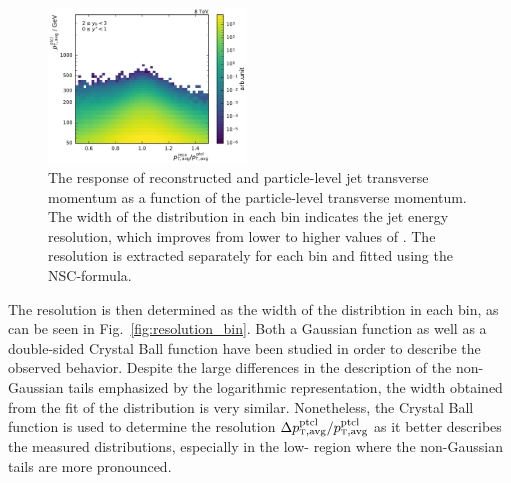 \begin{figure}[htbp]
    \includegraphics[width=0.47\textwidth]{figures/measurement/gen_vs_reco_vs_gen_ptavg_yb2ys0.pdf}
    \caption[Comparison of particle-level and reconstructed dijet transverse momentum]
            {The response of reconstructed and particle-level jet transverse
                momentum as a function of the particle-level transverse momentum.
                The width of the distribution in each \ptavg bin indicates the
                jet energy resolution, which improves from lower to higher values of \ptavg. The
                resolution is extracted separately for each bin and
                fitted using the NSC-formula.}
    \label{fig:gen_vs_reco_over_gen}
\end{figure}

The resolution is then determined as the width of the distribtion in each
\ptavggen
bin, as can be seen in Fig.~\ref{fig:resolution_bin}. Both a Gaussian function
as well as a double-sided Crystal Ball function have been studied in order to
describe the observed behavior. Despite the large differences in the
description of the non-Gaussian tails emphasized by the logarithmic
representation, the width obtained from the fit of the distribution is very similar.
Nonetheless, the Crystal Ball function is used to determine the resolution
$\Delta \ptavggen / \ptavggen$ as
it better describes the measured distributions, especially in the low-\pt
region where the non-Gaussian tails are more pronounced.

